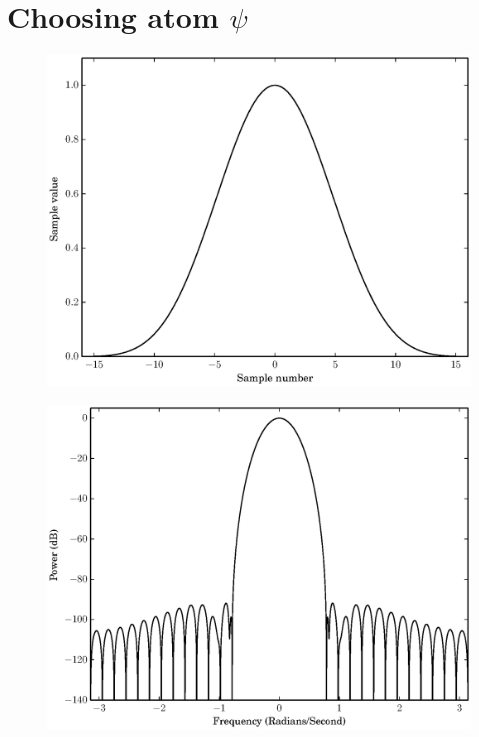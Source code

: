\section{Choosing atom $\psi$ \label{sec:optblackman}}

\begin{figure}[!t]
    \caption{\label{plot:opt_blackman}}
    \centering
    \includegraphics[width=\figwidthscale\textwidth]{plots/min4_blackman_td.eps}
    \CaptionWithTitle{%
    }{}
\end{figure}

\begin{figure}[!t]
    \caption{}
    \centering
    \includegraphics[width=\figwidthscale\textwidth]{plots/min4_blackman_fd.eps}
    \CaptionWithTitle{%
    }{}
\end{figure}

